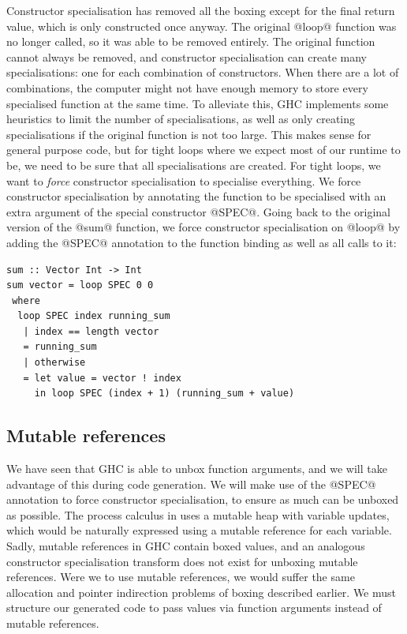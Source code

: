 Constructor specialisation has removed all the boxing except for the final return value, which is only constructed once anyway.
The original @loop@ function was no longer called, so it was able to be removed entirely.
The original function cannot always be removed, and constructor specialisation can create many specialisations: one for each combination of constructors.
When there are a lot of combinations, the computer might not have enough memory to store every specialised function at the same time.
To alleviate this, GHC implements some heuristics to limit the number of specialisations, as well as only creating specialisations if the original function is not too large.
This makes sense for general purpose code, but for tight loops where we expect most of our runtime to be, we need to be sure that all specialisations are created.
For tight loops, we want to \emph{force} constructor specialisation to specialise everything.
We force constructor specialisation by annotating the function to be specialised with an extra argument of the special constructor @SPEC@.
Going back to the original version of the @sum@ function, we force constructor specialisation on @loop@ by adding the @SPEC@ annotation to the function binding as well as all calls to it:

\begin{lstlisting}
sum :: Vector Int -> Int
sum vector = loop SPEC 0 0
 where
  loop SPEC index running_sum
   | index == length vector
   = running_sum
   | otherwise
   = let value = vector ! index
     in loop SPEC (index + 1) (running_sum + value)
\end{lstlisting}

\subsection{Mutable references}
\label{ss:extraction:mutablerefs}

We have seen that GHC is able to unbox function arguments, and we will take advantage of this during code generation.
We will make use of the @SPEC@ annotation to force constructor specialisation, to ensure as much can be unboxed as possible.
The process calculus in  uses a mutable heap with variable updates, which would be naturally expressed using a mutable reference for each variable.
Sadly, mutable references in GHC contain boxed values, and an analogous constructor specialisation transform does not exist for unboxing mutable references.
Were we to use mutable references, we would suffer the same allocation and pointer indirection problems of boxing described earlier.
We must structure our generated code to pass values via function arguments instead of mutable references.

